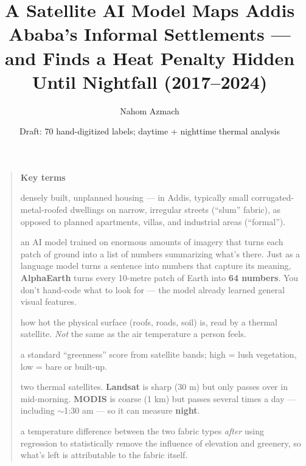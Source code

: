 \documentclass[11pt]{article}
\title{\vspace{-1.5em}A Satellite AI Model Maps Addis Ababa's Informal
Settlements --- and Finds a Heat Penalty Hidden Until Nightfall
(2017--2024)}
\author{Nahom Azmach}
\date{Draft: 70 hand-digitized labels; daytime + nighttime thermal analysis}
\begin{document}
\maketitle

\begin{quote}
\small
\textbf{Key terms}
\begin{description}[leftmargin=1em, itemsep=2pt]
  \item[Informal settlement:] densely built, unplanned housing --- in Addis,
  typically small corrugated-metal-roofed dwellings on narrow, irregular
  streets (``slum'' fabric), as opposed to planned apartments, villas, and
  industrial areas (``formal'').
  \item[Satellite embedding / foundation model:] an AI model trained on
  enormous amounts of imagery that turns each patch of ground into a list of
  numbers summarizing what's there. Just as a language model turns a sentence
  into numbers that capture its meaning, \textbf{AlphaEarth} turns every
  10-metre patch of Earth into \textbf{64 numbers}. You don't hand-code what
  to look for --- the model already learned general visual features.
  \item[LST (land-surface temperature):] how hot the physical surface (roofs,
  roads, soil) is, read by a thermal satellite. \emph{Not} the same as the
  air temperature a person feels.
  \item[NDVI:] a standard ``greenness'' score from satellite bands; high =
  lush vegetation, low = bare or built-up.
  \item[Landsat vs MODIS:] two thermal satellites. \textbf{Landsat} is sharp
  (30 m) but only passes over in mid-morning. \textbf{MODIS} is coarse (1 km)
  but passes several times a day --- including $\sim$1:30 am --- so it can
  measure \textbf{night}.
  \item[Adjusted effect:] a temperature difference between the two fabric
  types \emph{after} using regression to statistically remove the influence of
  elevation and greenery, so what's left is attributable to the fabric itself.
\end{description}
\end{quote}
\end{document}
